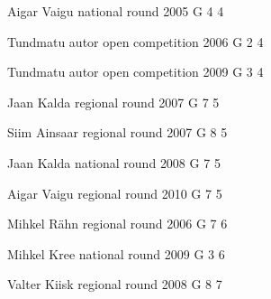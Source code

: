 \documentclass[11pt]{article}
\begin{document}
\ylDisplay{} %
{Aigar Vaigu} %
{national round} %
{2005} %
{G 4} %
{4} %
{

\ifEngStatement
\fi
}

\ylDisplay{} %
{Tundmatu autor} %
{open competition} %
{2006} %
{G 2} %
{4} %
{

\ifEngStatement
\fi
}

\ylDisplay{} %
{Tundmatu autor} %
{open competition} %
{2009} %
{G 3} %
{4} %
{

\ifEngStatement
\fi
}

\ylDisplay{} %
{Jaan Kalda} %
{regional round} %
{2007} %
{G 7} %
{5} %
{

\ifEngStatement
\fi
}

\ylDisplay{} %
{Siim Ainsaar} %
{regional round} %
{2007} %
{G 8} %
{5} %
{

\ifEngStatement
\fi
}

\ylDisplay{} %
{Jaan Kalda} %
{national round} %
{2008} %
{G 7} %
{5} %
{

\ifEngStatement
\fi
}

\ylDisplay{} %
{Aigar Vaigu} %
{regional round} %
{2010} %
{G 7} %
{5} %
{

\ifEngStatement
\fi
}

\ylDisplay{} %
{Mihkel Rähn} %
{regional round} %
{2006} %
{G 7} %
{6} %
{

\ifEngStatement
\fi
}

\ylDisplay{} %
{Mihkel Kree} %
{national round} %
{2009} %
{G 3} %
{6} %
{

\ifEngStatement
\fi
}

\ylDisplay{} %
{Valter Kiisk} %
{regional round} %
{2008} %
{G 8} %
{7} %
{

\ifEngStatement
\fi
}
\end{document}
